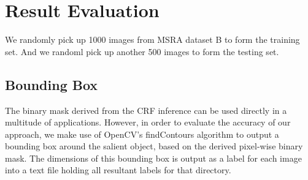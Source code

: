 \documentclass[10pt,twocolumn,letterpaper]{article}
\begin{document}
\section{Result Evaluation}
We randomly pick up 1000 images from MSRA dataset B to form the training set.
And we randoml pick up another 500 images to form the testing set.

\subsection{Bounding Box}
The binary mask derived from the CRF inference can be used directly in a multitude of applications. However, in order to evaluate the accuracy of our approach, we make use of OpenCV's findContours algorithm to output a bounding box around the salient object, based on the derived pixel-wise binary mask. The dimensions of this bounding box is output as a label for each image into a text file holding all resultant labels for that directory.

\end{document}
